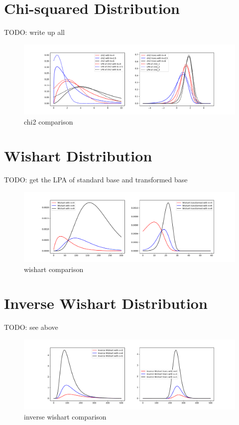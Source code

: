 \documentclass{article}
\begin{document}
\section{Chi-squared Distribution}

TODO: write up all

\begin{figure}[!htb]
	\centering
	\includegraphics[width=\textwidth]{chi2_playground.pdf}
	\caption{chi2 comparison}
	\label{fig:chi2_comparison}
\end{figure}

\section{Wishart Distribution}

TODO: get the LPA of standard base and transformed base

\begin{figure}[!htb]
	\centering
	\includegraphics[width=\textwidth]{wishart_playground.pdf}
	\caption{wishart comparison}
	\label{fig:wishart_comparison}
\end{figure}

\section{Inverse Wishart Distribution}

TODO: see above

\begin{figure}[!htb]
	\centering
	\includegraphics[width=\textwidth]{inverse_wishart_playground.pdf}
	\caption{inverse wishart comparison}
	\label{fig:inverse_wishart_comparison}
\end{figure}
\end{document}
